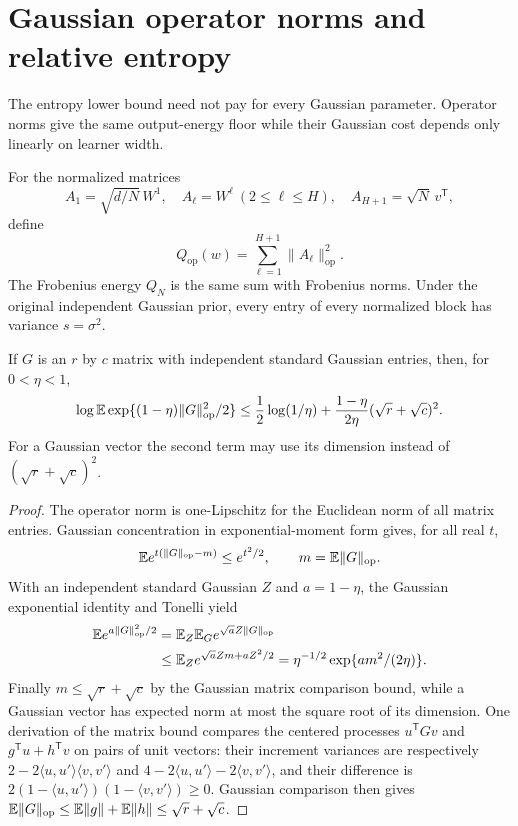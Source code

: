 \section{Gaussian operator norms and relative entropy}
\label{sec:operator-entropy}
The entropy lower bound need not pay for every Gaussian parameter. Operator norms give the same output-energy floor while their Gaussian cost depends only linearly on learner width.

For the normalized matrices
\[
 A_1=\sqrt{d/N}\,W^1,\quad A_\ell=W^\ell\ (2\le\ell\le H),
 \quad A_{H+1}=\sqrt N\,v^{\mathsf T},
\]
define
\[
 Q_{\mathrm{op}}(w)=\sum_{\ell=1}^{H+1}\|A_\ell\|_{\mathrm{op}}^2.
\]
The Frobenius energy $Q_N$ is the same sum with Frobenius norms. Under the original independent Gaussian prior, every entry of every normalized block has variance $s=\sigma^2$.

\begin{lemma}
\label{lem:operator-mgf}
If $G$ is an $r$ by $c$ matrix with independent standard Gaussian entries, then, for $0<\eta<1$,
\[
 \log\mathbb E\exp\{(1-\eta)\|G\|_{\mathrm{op}}^2/2\}
 \le\frac12\log(1/\eta)
       +\frac{1-\eta}{2\eta}(\sqrt r+\sqrt c)^2.
\]
For a Gaussian vector the second term may use its dimension instead of $(\sqrt r+\sqrt c)^2$.
\end{lemma}
\begin{proof}
The operator norm is one-Lipschitz for the Euclidean norm of all matrix entries. Gaussian concentration in exponential-moment form gives, for all real $t$,
\[
 \mathbb E e^{t(\|G\|_{\mathrm{op}}-m)}\le e^{t^2/2},
 \qquad m=\mathbb E\|G\|_{\mathrm{op}}.
\]
With an independent standard Gaussian $Z$ and $a=1-\eta$, the Gaussian exponential identity and Tonelli yield
\begin{align*}
 \mathbb E e^{a\|G\|_{\mathrm{op}}^2/2}
 &=\mathbb E_Z\mathbb E_G e^{\sqrt aZ\|G\|_{\mathrm{op}}}\\
 &\le\mathbb E_Z e^{\sqrt aZm+aZ^2/2}
 =\eta^{-1/2}\exp\{a m^2/(2\eta)\}.
\end{align*}
Finally $m\le\sqrt r+\sqrt c$ by the Gaussian matrix comparison bound, while a Gaussian vector has expected norm at most the square root of its dimension. One derivation of the matrix bound compares the centered processes $u^{\mathsf T}Gv$ and $g^{\mathsf T}u+h^{\mathsf T}v$ on pairs of unit vectors: their increment variances are respectively $2-2\langle u,u'\rangle\langle v,v'\rangle$ and $4-2\langle u,u'\rangle-2\langle v,v'\rangle$, and their difference is $2(1-\langle u,u'\rangle)(1-\langle v,v'\rangle)\ge0$. Gaussian comparison then gives $\mathbb E\|G\|_{\mathrm{op}}\le\mathbb E\|g\|+\mathbb E\|h\|\le\sqrt r+\sqrt c$.
\end{proof}


